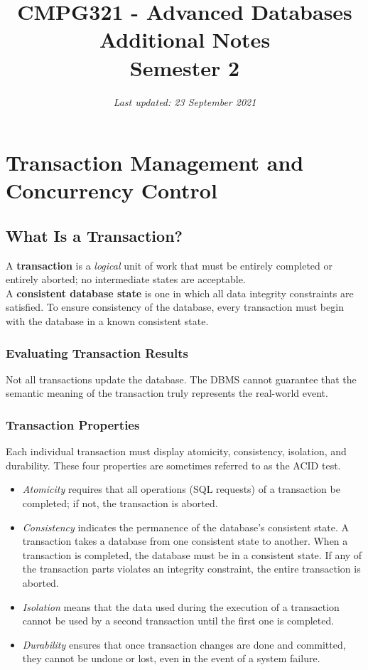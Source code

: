 \documentclass[a4paper, 11pt, titlepage]{report}
\begin{document}
\linespread{1.25}
\title{CMPG321 - Advanced Databases\\Additional Notes\\Semester 2}
\date{\textit{Last updated: 23 September 2021}}
\maketitle
\tableofcontents{}

\chapter{Transaction Management and Concurrency Control}
\section{What Is a Transaction?}
A \textbf{transaction} is a \textit{logical} unit of work that must be entirely completed or entirely aborted; no intermediate states are acceptable.\\
A \textbf{consistent database state} is one in which all data integrity constraints are satisfied. To ensure consistency of the database, every transaction must begin with the database in a known consistent state.
\subsection{Evaluating Transaction Results}
Not all transactions update the database. The DBMS cannot guarantee that the semantic meaning of the transaction truly represents the real-world event.
\subsection{Transaction Properties}
Each individual transaction must display atomicity, consistency, isolation, and durability.
These four properties are sometimes referred to as the ACID test.
\begin{itemize}
\item \textit{Atomicity} requires that all operations (SQL requests) of a transaction be completed;
if not, the transaction is aborted.
\item \textit{Consistency} indicates the permanence of the database's consistent state. A transaction takes a database from one consistent state to another. When a transaction is completed, the database must be in a consistent state. If any of the transaction parts violates an integrity constraint, the entire transaction is aborted.
\item \textit{Isolation} means that the data used during the execution of a transaction cannot be used by a second transaction until the first one is completed.
\item \textit{Durability} ensures that once transaction changes are done and committed, they cannot be undone or lost, even in the event of a system failure.
\end{itemize}
\end{document}
